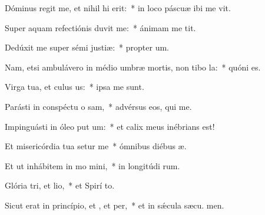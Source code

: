 \item Dóminus regit me, et nihil hi erit:~* in loco páscuæ ibi me vit.
\item Super aquam refectiónis duvit me:~* ánimam me tit.
\item Dedúxit me super sémi justiæ:~* propter  um.
\item Nam, etsi ambulávero in médio umbræ mortis, non tibo la:~* quóni   es.
\item Virga tua, et culus us:~* ipsa me  sunt.
\item Parásti in conspéctu o sam,~* advérsus eos, qui  me.
\item Impinguásti in óleo put um:~* et calix meus inébrians   est!
\item Et misericórdia tua setur me~* ómnibus diébus  æ.
\item Et ut inhábitem in mo mini,~* in longitúdi rum.
\item Glória tri, et lio,~* et Spirí to.
\item Sicut erat in princípio, et , et per,~* et in sǽcula sæcu. men.
